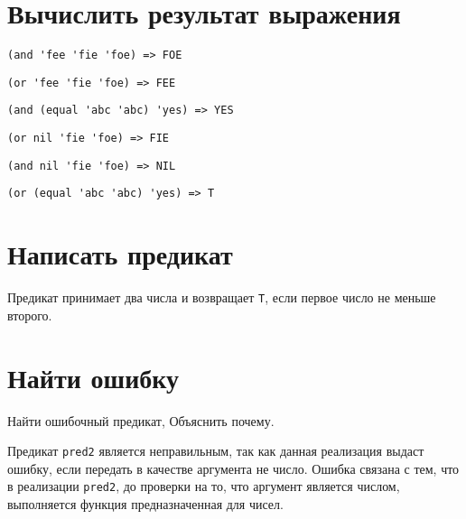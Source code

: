 \section{Вычислить результат выражения}

\problem \hfill
\begin{lstlisting}
(and 'fee 'fie 'foe) => FOE
\end{lstlisting}


\problem \hfill
\begin{lstlisting}
(or 'fee 'fie 'foe) => FEE
\end{lstlisting}


\problem \hfill
\begin{lstlisting}
(and (equal 'abc 'abc) 'yes) => YES
\end{lstlisting}


\problem \hfill
\begin{lstlisting}
(or nil 'fie 'foe) => FIE
\end{lstlisting}


\problem \hfill
\begin{lstlisting}
(and nil 'fie 'foe) => NIL
\end{lstlisting}


\problem \hfill
\begin{lstlisting}
(or (equal 'abc 'abc) 'yes) => T
\end{lstlisting}



\section{Написать предикат}

\problem
Предикат принимает два числа и возвращает \verb|T|, если первое число не меньше второго.




\section{Найти ошибку}

\problem Найти ошибочный предикат, Объяснить почему.


\noindent
Предикат \verb|pred2| является неправильным, так как данная реализация выдаст ошибку, если передать в качестве аргумента не число. Ошибка связана с тем, что в реализации \verb|pred2|, до проверки на то, что аргумент является числом, выполняется функция предназначенная для чисел.